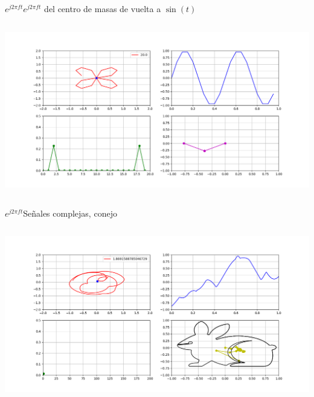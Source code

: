 \begin{frame}{$e^{j2\pi ft}$}{$e^{j2\pi ft}$ del centro de masas de vuelta a $\sin(t)$}
   \handsonicon
   \begin{columns}[onlytextwidth]
      
      
      \centering\includegraphics[width=1.0\textwidth]{2_clase/euler5}
   \end{columns}
   \vfill
\end{frame}
\begin{frame}{$e^{j2\pi ft}$}{Señales complejas, conejo}
   \handsonicon
   \begin{columns}[onlytextwidth]
      
      
      \centering\includegraphics[width=1.0\textwidth]{2_clase/euler6}
   \end{columns}
   \vfill
\end{frame}
